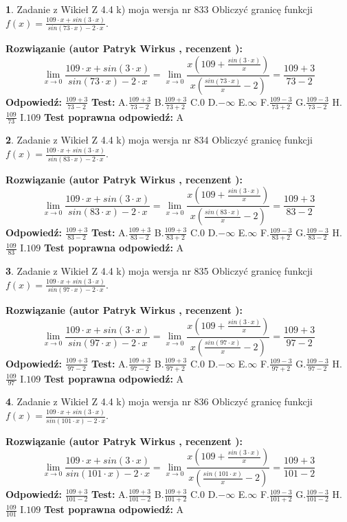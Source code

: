 \documentclass[12pt, a4paper]{article}
\theoremstyle{definition} %
\newtheorem{zad}{}
\newcommand{\zadStart}[1]{\begin{zad}#1\newline}
\newcommand{\zadStop}{\end{zad}}
\newcommand{\rozwStart}[2]{\noindent \textbf{Rozwiązanie (autor #1 , recenzent #2): }\newline}
\newcommand{\rozwStop}{\newline}
\newcommand{\odpStart}{\noindent \textbf{Odpowiedź:}\newline}
\newcommand{\odpStop}{\newline}
\newcommand{\testStart}{\noindent \textbf{Test:}\newline}
\newcommand{\testStop}{\newline}
\newcommand{\kluczStart}{\noindent \textbf{Test poprawna odpowiedź:}\newline}
\newcommand{\kluczStop}{\newline}
\begin{document}
\zadStart{Zadanie z Wikieł Z 4.4 k) moja wersja nr 833}
Obliczyć granicę funkcji $f(x)=\frac{109\cdot x +sin(3\cdot x)}{sin(73\cdot x) -2\cdot x}$.
\zadStop
\rozwStart{Patryk Wirkus}{}
$$\lim\limits_{x\to 0}\frac{109\cdot x +sin(3\cdot x)}{sin(73\cdot x) -2\cdot x}
=\lim\limits_{x\to 0}\frac{x(109+\frac{sin(3\cdot x)}{x})}{x(\frac{sin(73\cdot x)}{x}-2)}
=\frac{109+3}{73-2}$$
\rozwStop
\odpStart
$\frac{109+3}{73-2}$
\odpStop
\testStart
A.$\frac{109+3}{73-2}$
B.$\frac{109+3}{73+2}$
C.$0$
D.$-\infty$
E.$\infty$
F.$\frac{109-3}{73+2}$
G.$\frac{109-3}{73-2}$
H.$\frac{109}{73}$
I.$109$
\testStop
\kluczStart
A
\kluczStop



\zadStart{Zadanie z Wikieł Z 4.4 k) moja wersja nr 834}
Obliczyć granicę funkcji $f(x)=\frac{109\cdot x +sin(3\cdot x)}{sin(83\cdot x) -2\cdot x}$.
\zadStop
\rozwStart{Patryk Wirkus}{}
$$\lim\limits_{x\to 0}\frac{109\cdot x +sin(3\cdot x)}{sin(83\cdot x) -2\cdot x}
=\lim\limits_{x\to 0}\frac{x(109+\frac{sin(3\cdot x)}{x})}{x(\frac{sin(83\cdot x)}{x}-2)}
=\frac{109+3}{83-2}$$
\rozwStop
\odpStart
$\frac{109+3}{83-2}$
\odpStop
\testStart
A.$\frac{109+3}{83-2}$
B.$\frac{109+3}{83+2}$
C.$0$
D.$-\infty$
E.$\infty$
F.$\frac{109-3}{83+2}$
G.$\frac{109-3}{83-2}$
H.$\frac{109}{83}$
I.$109$
\testStop
\kluczStart
A
\kluczStop



\zadStart{Zadanie z Wikieł Z 4.4 k) moja wersja nr 835}
Obliczyć granicę funkcji $f(x)=\frac{109\cdot x +sin(3\cdot x)}{sin(97\cdot x) -2\cdot x}$.
\zadStop
\rozwStart{Patryk Wirkus}{}
$$\lim\limits_{x\to 0}\frac{109\cdot x +sin(3\cdot x)}{sin(97\cdot x) -2\cdot x}
=\lim\limits_{x\to 0}\frac{x(109+\frac{sin(3\cdot x)}{x})}{x(\frac{sin(97\cdot x)}{x}-2)}
=\frac{109+3}{97-2}$$
\rozwStop
\odpStart
$\frac{109+3}{97-2}$
\odpStop
\testStart
A.$\frac{109+3}{97-2}$
B.$\frac{109+3}{97+2}$
C.$0$
D.$-\infty$
E.$\infty$
F.$\frac{109-3}{97+2}$
G.$\frac{109-3}{97-2}$
H.$\frac{109}{97}$
I.$109$
\testStop
\kluczStart
A
\kluczStop



\zadStart{Zadanie z Wikieł Z 4.4 k) moja wersja nr 836}
Obliczyć granicę funkcji $f(x)=\frac{109\cdot x +sin(3\cdot x)}{sin(101\cdot x) -2\cdot x}$.
\zadStop
\rozwStart{Patryk Wirkus}{}
$$\lim\limits_{x\to 0}\frac{109\cdot x +sin(3\cdot x)}{sin(101\cdot x) -2\cdot x}
=\lim\limits_{x\to 0}\frac{x(109+\frac{sin(3\cdot x)}{x})}{x(\frac{sin(101\cdot x)}{x}-2)}
=\frac{109+3}{101-2}$$
\rozwStop
\odpStart
$\frac{109+3}{101-2}$
\odpStop
\testStart
A.$\frac{109+3}{101-2}$
B.$\frac{109+3}{101+2}$
C.$0$
D.$-\infty$
E.$\infty$
F.$\frac{109-3}{101+2}$
G.$\frac{109-3}{101-2}$
H.$\frac{109}{101}$
I.$109$
\testStop
\kluczStart
A
\kluczStop
\end{document}
